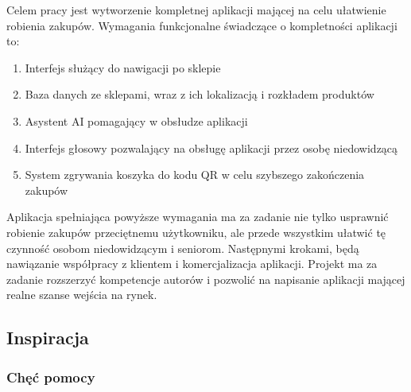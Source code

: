 Celem pracy jest wytworzenie kompletnej aplikacji mającej na celu ułatwienie robienia zakupów. Wymagania funkcjonalne świadczące o kompletności aplikacji to:
\begin{enumerate}
    \item Interfejs służący do nawigacji po sklepie
    \item Baza danych ze sklepami, wraz z ich lokalizacją i rozkładem produktów
    \item Asystent AI pomagający w obsłudze aplikacji
    \item Interfejs głosowy pozwalający na obsługę aplikacji przez osobę niedowidzącą
    \item System zgrywania koszyka do kodu QR w celu szybszego zakończenia zakupów
\end{enumerate}
Aplikacja spełniająca powyższe wymagania ma za zadanie nie tylko usprawnić robienie zakupów przeciętnemu użytkowniku, ale przede wszystkim ułatwić tę czynność osobom niedowidzącym i seniorom. Następnymi krokami, będą nawiązanie współpracy z klientem i komercjalizacja aplikacji. Projekt ma za zadanie rozszerzyć kompetencje autorów i pozwolić na napisanie aplikacji mającej realne szanse wejścia na rynek. 



\subsection{Inspiracja}

\subsubsection{Chęć pomocy}